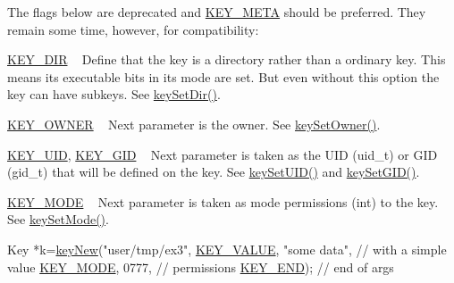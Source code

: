 \begin{DoxyRefList}
\item[\label{deprecated__deprecated000010}%
\Hypertarget{deprecated__deprecated000010}%
Member \hyperlink{group__key_gad23c65b44bf48d773759e1f9a4d43b89}{key\+New} (const char $\ast$name,...)]The flags below are deprecated and \hyperlink{group__key_gga91fb3178848bd682000958089abbaf40a040582834bb2d90049947d7ef74e87e2}{K\+E\+Y\+\_\+\+M\+E\+TA} should be preferred. They remain some time, however, for compatibility\+:
\begin{DoxyItemize}
\item \hyperlink{group__key_gga91fb3178848bd682000958089abbaf40a9e43e47c8a21478538e2d20e049981d5}{K\+E\+Y\+\_\+\+D\+IR} ~\newline
 Define that the key is a directory rather than a ordinary key. This means its executable bits in its mode are set. But even without this option the key can have subkeys. See \hyperlink{group__meta_gaae575bd86a628a15ee45baa860522e75}{key\+Set\+Dir()}.
\item \hyperlink{group__key_gga91fb3178848bd682000958089abbaf40a77ca60362fa8daca8d5347db4385068b}{K\+E\+Y\+\_\+\+O\+W\+N\+ER} ~\newline
 Next parameter is the owner. See \hyperlink{owner_8c_a88d6ec200ba0707b7c1b4a88133d2be4}{key\+Set\+Owner()}.
\item \hyperlink{group__key_gga91fb3178848bd682000958089abbaf40a28f01a87d65f065172f734c9c9446c0e}{K\+E\+Y\+\_\+\+U\+ID}, \hyperlink{group__key_gga91fb3178848bd682000958089abbaf40ac0628bbaba7c837ca73323681393d15f}{K\+E\+Y\+\_\+\+G\+ID} ~\newline
 Next parameter is taken as the U\+ID (uid\+\_\+t) or G\+ID (gid\+\_\+t) that will be defined on the key. See \hyperlink{group__meta_gab5f284f5ecd261e0a290095f50ba1af7}{key\+Set\+U\+I\+D()} and \hyperlink{group__meta_ga9e3d0fb3f7ba906e067727b9155d22e3}{key\+Set\+G\+I\+D()}.
\item \hyperlink{group__key_gga91fb3178848bd682000958089abbaf40a1b0a91ff3a855d6993930ebf0abaa518}{K\+E\+Y\+\_\+\+M\+O\+DE} ~\newline
 Next parameter is taken as mode permissions (int) to the key. See \hyperlink{group__meta_ga8803037e35b9da1ce492323a88ff6bc3}{key\+Set\+Mode()}. 
\begin{DoxyCodeInclude}
Key *k=\hyperlink{group__key_gad23c65b44bf48d773759e1f9a4d43b89}{keyNew}(\textcolor{stringliteral}{"user/tmp/ex3"},
        \hyperlink{group__key_gga91fb3178848bd682000958089abbaf40ac66e4a49d09212b79f5754ca6db5bd2e}{KEY\_VALUE}, \textcolor{stringliteral}{"some data"},    \textcolor{comment}{// with a simple value}
        \hyperlink{group__key_gga91fb3178848bd682000958089abbaf40a1b0a91ff3a855d6993930ebf0abaa518}{KEY\_MODE}, 0777,            \textcolor{comment}{// permissions}
        \hyperlink{group__key_gga91fb3178848bd682000958089abbaf40aa8adb6fcb92dec58fb19410eacfdd403}{KEY\_END});                  \textcolor{comment}{// end of args}
\end{DoxyCodeInclude}


\end{DoxyItemize}
\end{DoxyRefList}

